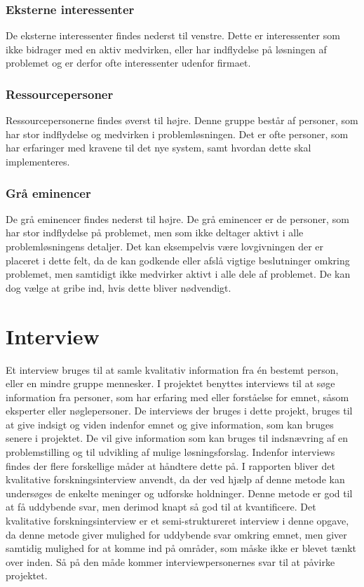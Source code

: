 \subsubsection{Eksterne interessenter}
De eksterne interessenter findes nederst til venstre. Dette er interessenter som ikke bidrager med en aktiv medvirken, eller har indflydelse på løsningen af problemet og er derfor ofte interessenter udenfor firmaet.\citep{MetteLindegaardAttrup2008}

\subsubsection{Ressourcepersoner}
Ressourcepersonerne findes øverst til højre. Denne gruppe består af personer, som har stor indflydelse og medvirken i problemløsningen. Det er ofte personer, som har erfaringer med kravene til det nye system, samt hvordan dette skal implementeres.\citep{MetteLindegaardAttrup2008}

\subsubsection{Grå eminencer}
De grå eminencer findes nederst til højre. De grå eminencer er de personer, som har stor indflydelse på problemet, men som ikke deltager aktivt i alle problemløsningens detaljer. Det kan eksempelvis være lovgivningen der er placeret i dette felt, da de kan godkende eller afslå vigtige beslutninger omkring problemet, men samtidigt ikke medvirker aktivt i alle dele af problemet. De kan dog vælge at gribe ind, hvis dette bliver nødvendigt.\citep{MetteLindegaardAttrup2008}

\section{Interview}
Et interview bruges til at samle kvalitativ information fra én bestemt person, eller en mindre gruppe mennesker. I projektet benyttes interviews til at søge information fra personer, som har erfaring med eller forståelse for emnet, såsom eksperter eller nøglepersoner. De interviews der bruges i dette projekt, bruges til at give indsigt og viden indenfor emnet og give information, som kan bruges senere i projektet. De vil give information som kan bruges til indsnævring af en problemstilling og til udvikling af mulige løsningsforslag.
Indenfor interviews findes der flere forskellige måder at håndtere dette på. I rapporten bliver det kvalitative forskningsinterview anvendt, da der ved hjælp af denne metode kan undersøges de enkelte meninger og udforske holdninger. Denne metode er god til at få uddybende svar, men derimod knapt så god til at kvantificere.
Det kvalitative forskningsinterview er et semi-struktureret interview i denne opgave, da denne metode giver mulighed for uddybende svar omkring emnet, men giver samtidig mulighed for at komme ind på områder, som måske ikke er blevet tænkt over inden. Så på den måde kommer interviewpersonernes svar til at påvirke projektet.\citep{BjarneHjorthAndersen, kvale2009}


